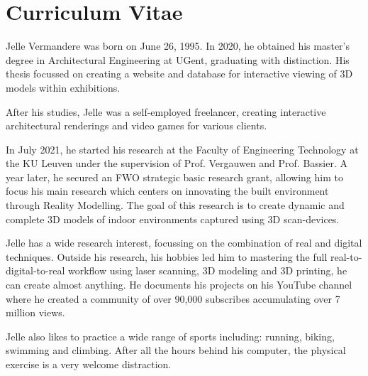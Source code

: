 \chapter{Curriculum Vitae}\label{ch:curriculum}

Jelle Vermandere was born on June 26, 1995. In 2020, he obtained his master’s degree in Architectural Engineering at UGent, graduating with distinction. 
His thesis focussed on creating a website and database for interactive viewing of 3D models within exhibitions.

After his studies, Jelle was a self-employed freelancer, creating interactive architectural renderings and video games for various clients.

In July 2021, he started his research at the Faculty of Engineering Technology at the KU Leuven under the supervision of Prof. Vergauwen and Prof. Bassier. 
A year later, he secured an FWO strategic basic research grant, allowing him to focus his main research which centers on innovating the built environment through Reality Modelling.
The goal of this research is to create dynamic and complete 3D models of indoor environments captured using 3D scan-devices.

Jelle has a wide research interest, focussing on the combination of real and digital techniques. 
Outside his research, his hobbies led him to mastering the full real-to-digital-to-real workflow using laser scanning, 3D modeling and 3D printing, he can create almost anything.
He documents his projects on his YouTube channel where he created a community of over 90,000 subscribes accumulating over 7 million views.

Jelle also likes to practice a wide range of sports including: running, biking, swimming and climbing. 
After all the hours behind his computer, the physical exercise is a very welcome distraction.



\cleardoublepage

